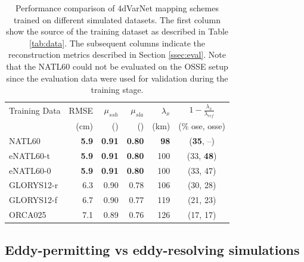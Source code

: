 \documentclass[draft]{agujournal2019}
\begin{document}
\begin{table}[H]
\centering
\begin{tabular}{l||rrrrc}
\toprule
Training Data & RMSE  & $\mu_{ssh}$  & $\mu_{sla}$ & $\lambda_x$ & $1 - \frac{\lambda_x}{\lambda_{ref}}$ \\
 &  (cm) &  () &  () &  (km) & (\% ose, osse) \\
\midrule
NATL60 & \textbf{5.9}  & \textbf{0.91}  & \textbf{0.80}  & \textbf{98} & (\textbf{35}, --)\\
eNATL60-t & \textbf{5.9}  & \textbf{0.91}  & \textbf{0.80}  & 100 & (33, \textbf{48})\\
eNATL60-0 & \textbf{5.9}  & \textbf{0.91}  & \textbf{0.80}  & 100 & (33, 47)\\
GLORYS12-r & 6.3  & 0.90  & 0.78  & 106  & (30, 28)\\
GLORYS12-f & 6.7  & 0.90  & 0.77  & 119 & (21, 23)\\
ORCA025 & 7.1  & 0.89  & 0.76  & 126 & (17, 17)\\
\bottomrule
\end{tabular}

\caption{Performance comparison of 4dVarNet mapping schemes trained on different simulated datasets. The first column show the source of the training dataset as described in Table \ref{tab:data}. The subsequent columns indicate the reconstruction metrics described in Section \ref{ssec:eval}. Note that the NATL60 could not be evaluated on the OSSE setup since the evaluation data were used for validation during the training stage.}
\label{tab:res}
\end{table}

\subsection{Eddy-permitting vs eddy-resolving simulations}
\label{ssec:resolution}
\end{document}

